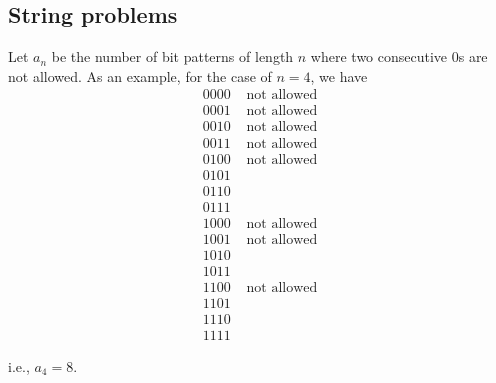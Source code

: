 \subsection{String problems}

\begin{ex}
  Let $a_n$ be the number of bit patterns of length $n$ where
  two consecutive 0s are not allowed.
  As an example, for the case of $n = 4$, we have
  \begin{align*}
     0000 & \text{ not allowed} \\
     0001 & \text{ not allowed} \\
     0010 & \text{ not allowed} \\
     0011 & \text{ not allowed} \\
     0100 & \text{ not allowed} \\
     0101 & \text{ }\\
     0110 & \text{ }\\
     0111 & \text{ }\\
     1000 & \text{ not allowed} \\
     1001 & \text{ not allowed} \\
     1010 & \text{ }\\
     1011 & \text{ }\\
     1100 & \text{ not allowed} \\
     1101 & \text{ }\\
     1110 & \text{ }\\
     1111 & \text{ }
  \end{align*}
\end{ex}
i.e., $a_4 = 8$.
